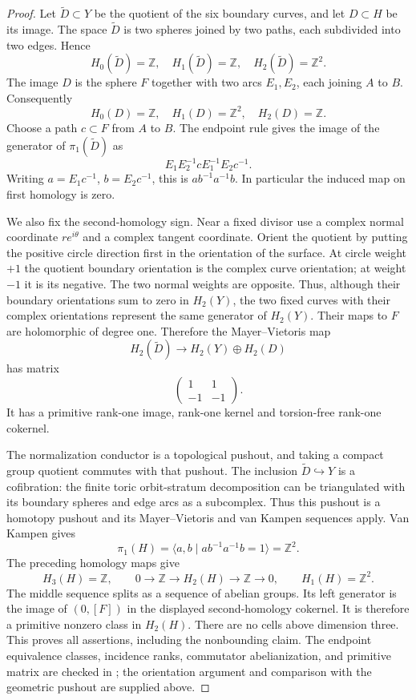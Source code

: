 \begin{proof}
Let \(\widetilde D\subset Y\) be the quotient of the six
boundary curves, and let \(D\subset H\) be its image. The space
\(\widetilde D\) is two spheres joined by two paths, each
subdivided into two edges. Hence
\[
 H_0(\widetilde D)=\mathbb Z,\quad
 H_1(\widetilde D)=\mathbb Z,\quad
 H_2(\widetilde D)=\mathbb Z^2.
\]
The image \(D\) is the sphere \(F\) together with two arcs
\(E_1,E_2\), each joining \(A\) to \(B\). Consequently
\[
 H_0(D)=\mathbb Z,\quad H_1(D)=\mathbb Z^2,\quad
 H_2(D)=\mathbb Z.
\]
Choose a path \(c\subset F\) from \(A\) to \(B\). The
endpoint rule gives the image of the generator of
\(\pi_1(\widetilde D)\) as
\[
 E_1E_2^{-1}cE_1^{-1}E_2c^{-1}.
\]
Writing \(a=E_1c^{-1}\), \(b=E_2c^{-1}\), this is
\(ab^{-1}a^{-1}b\). In particular the induced map on first
homology is zero.

We also fix the second-homology sign. Near a fixed divisor use a
complex normal coordinate \(re^{i\theta}\) and a complex tangent
coordinate. Orient the quotient by putting the positive circle
direction first in the orientation of the surface. At circle
weight \(+1\) the quotient boundary orientation is the complex
curve orientation; at weight \(-1\) it is its negative. The
two normal weights are opposite. Thus, although their boundary
orientations sum to zero in \(H_2(Y)\), the two fixed curves
with their complex orientations represent the same generator
of \(H_2(Y)\). Their maps to \(F\) are holomorphic of degree
one. Therefore the Mayer--Vietoris map
\[
 H_2(\widetilde D)\longrightarrow H_2(Y)\oplus H_2(D)
\]
has matrix
\[
 \begin{pmatrix}1&1\\-1&-1\end{pmatrix}.
\]
It has a primitive rank-one image, rank-one kernel and torsion-free
rank-one cokernel.

The normalization conductor is a topological pushout, and taking
a compact group quotient commutes with that pushout. The inclusion
\(\widetilde D\hookrightarrow Y\) is a cofibration: the finite
toric orbit-stratum decomposition can be triangulated with its
boundary spheres and edge arcs as a subcomplex. Thus this pushout
is a homotopy pushout and its Mayer--Vietoris and van Kampen
sequences apply. Van Kampen gives
\[
 \pi_1(H)=\langle a,b\mid ab^{-1}a^{-1}b=1\rangle
            =\mathbb Z^2.
\]
The preceding homology maps give
\[
 H_3(H)=\mathbb Z,\qquad
 0\longrightarrow\mathbb Z\longrightarrow H_2(H)
      \longrightarrow\mathbb Z\longrightarrow0,
 \qquad H_1(H)=\mathbb Z^2.
\]
The middle sequence splits as a sequence of abelian groups. Its
left generator is the image of \((0,[F])\) in the displayed
second-homology cokernel. It is therefore a primitive nonzero
class in \(H_2(H)\). There are no cells above dimension three.
This proves all assertions, including the nonbounding claim.
The endpoint equivalence classes, incidence ranks, commutator
abelianization, and primitive matrix are checked in
; the orientation argument
and comparison with the geometric pushout are supplied above.
\end{proof}


